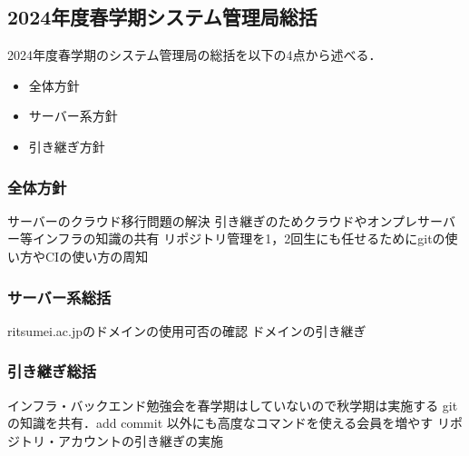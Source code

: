 \subsection*{2024年度春学期システム管理局総括}


2024年度春学期のシステム管理局の総括を以下の4点から述べる．
\begin{itemize}
    \item 全体方針
    \item サーバー系方針
    \item 引き継ぎ方針
\end{itemize}

\subsubsection*{全体方針}
サーバーのクラウド移行問題の解決
引き継ぎのためクラウドやオンプレサーバー等インフラの知識の共有
リポジトリ管理を1，2回生にも任せるためにgitの使い方やCIの使い方の周知

\subsubsection*{サーバー系総括}
ritsumei.ac.jpのドメインの使用可否の確認
ドメインの引き継ぎ

\subsubsection*{引き継ぎ総括}
インフラ・バックエンド勉強会を春学期はしていないので秋学期は実施する
gitの知識を共有．add commit 以外にも高度なコマンドを使える会員を増やす
リポジトリ・アカウントの引き継ぎの実施
